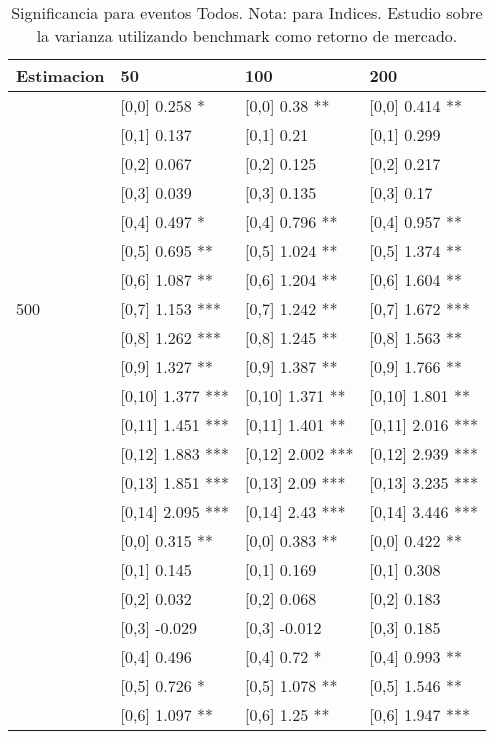 \begin{table}

\caption{Significancia para eventos Todos. Nota: para Indices. Estudio sobre la varianza utilizando benchmark como retorno de mercado.}
\centering
\begin{tabular}[t]{llll}
\toprule
Estimacion & 50 & 100 & 200\\
\midrule
 & {}[0,0] 0.258 * & {}[0,0] 0.38 ** & {}[0,0] 0.414 **\\
 & {}[0,1] 0.137 & {}[0,1] 0.21 & {}[0,1] 0.299\\
 & {}[0,2] 0.067 & {}[0,2] 0.125 & {}[0,2] 0.217\\
 & {}[0,3] 0.039 & {}[0,3] 0.135 & {}[0,3] 0.17\\
 & {}[0,4] 0.497 * & {}[0,4] 0.796 ** & {}[0,4] 0.957 **\\
\addlinespace
 & {}[0,5] 0.695 ** & {}[0,5] 1.024 ** & {}[0,5] 1.374 **\\
 & {}[0,6] 1.087 ** & {}[0,6] 1.204 ** & {}[0,6] 1.604 **\\
500 & {}[0,7] 1.153 *** & {}[0,7] 1.242 ** & {}[0,7] 1.672 ***\\
 & {}[0,8] 1.262 *** & {}[0,8] 1.245 ** & {}[0,8] 1.563 **\\
 & {}[0,9] 1.327 ** & {}[0,9] 1.387 ** & {}[0,9] 1.766 **\\
\addlinespace
 & {}[0,10] 1.377 *** & {}[0,10] 1.371 ** & {}[0,10] 1.801 **\\
 & {}[0,11] 1.451 *** & {}[0,11] 1.401 ** & {}[0,11] 2.016 ***\\
 & {}[0,12] 1.883 *** & {}[0,12] 2.002 *** & {}[0,12] 2.939 ***\\
 & {}[0,13] 1.851 *** & {}[0,13] 2.09 *** & {}[0,13] 3.235 ***\\
 & {}[0,14] 2.095 *** & {}[0,14] 2.43 *** & {}[0,14] 3.446 ***\\
\addlinespace
 & {}[0,0] 0.315 ** & {}[0,0] 0.383 ** & {}[0,0] 0.422 **\\
 & {}[0,1] 0.145 & {}[0,1] 0.169 & {}[0,1] 0.308\\
 & {}[0,2] 0.032 & {}[0,2] 0.068 & {}[0,2] 0.183\\
 & {}[0,3] -0.029 & {}[0,3] -0.012 & {}[0,3] 0.185\\
 & {}[0,4] 0.496 & {}[0,4] 0.72 * & {}[0,4] 0.993 **\\
\addlinespace
 & {}[0,5] 0.726 * & {}[0,5] 1.078 ** & {}[0,5] 1.546 **\\
 & {}[0,6] 1.097 ** & {}[0,6] 1.25 ** & {}[0,6] 1.947 ***\\

\end{tabular}
\end{table}
